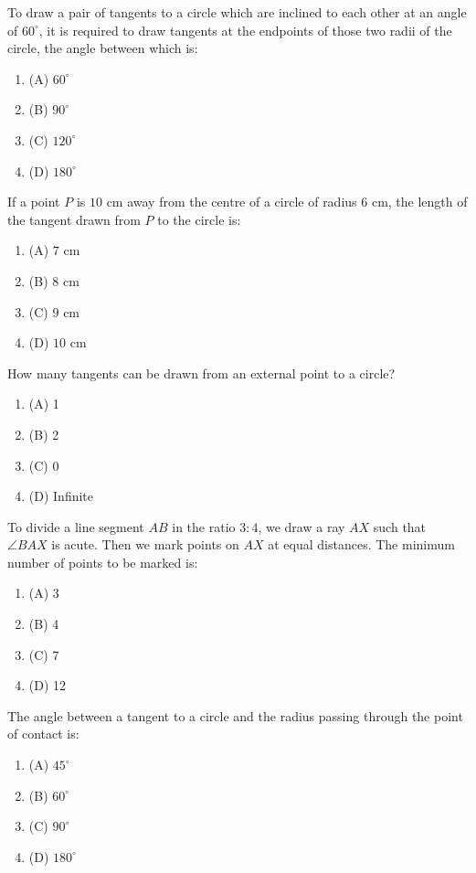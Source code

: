 \documentclass[12pt,a4paper]{exam}
\begin{document}
\begin{questions}
\question[1] To draw a pair of tangents to a circle which are inclined to each other at an angle of $60^{\circ}$, it is required to draw tangents at the endpoints of those two radii of the circle, the angle between which is:
\begin{enumerate}[label=(\Alph*)]
  \item (A) $60^{\circ}$
  \item (B) $90^{\circ}$
  \item (C) $120^{\circ}$
  \item (D) $180^{\circ}$
\end{enumerate}
\vspace{0.15cm}

\question[1] If a point $P$ is $10$ cm away from the centre of a circle of radius $6$ cm, the length of the tangent drawn from $P$ to the circle is:
\begin{enumerate}[label=(\Alph*)]
  \item (A) $7$ cm
  \item (B) $8$ cm
  \item (C) $9$ cm
  \item (D) $10$ cm
\end{enumerate}
\vspace{0.15cm}

\question[1] How many tangents can be drawn from an external point to a circle?
\begin{enumerate}[label=(\Alph*)]
  \item (A) 1
  \item (B) 2
  \item (C) 0
  \item (D) Infinite
\end{enumerate}
\vspace{0.15cm}

\question[1] To divide a line segment $AB$ in the ratio $3:4$, we draw a ray $AX$ such that $\angle BAX$ is acute. Then we mark points on $AX$ at equal distances. The minimum number of points to be marked is:
\begin{enumerate}[label=(\Alph*)]
  \item (A) 3
  \item (B) 4
  \item (C) 7
  \item (D) 12
\end{enumerate}
\vspace{0.15cm}

\question[1] The angle between a tangent to a circle and the radius passing through the point of contact is:
\begin{enumerate}[label=(\Alph*)]
  \item (A) $45^{\circ}$
  \item (B) $60^{\circ}$
  \item (C) $90^{\circ}$
  \item (D) $180^{\circ}$
\end{enumerate}
\vspace{0.15cm}


\end{questions}
\end{document}
